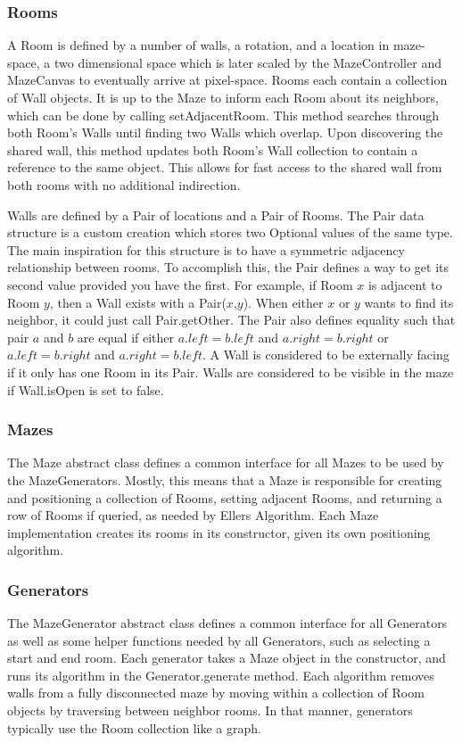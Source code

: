 \documentclass[12pt,letterpaper]{article}
\begin{document}
	
	\subsubsection{Rooms}
	
	A Room is defined by a number of walls, a rotation, and a location in maze-space, a two dimensional space which is later scaled by the MazeController and MazeCanvas to eventually arrive at pixel-space. Rooms each contain a collection of Wall objects. It is up to the Maze to inform each Room about its neighbors, which can be done by calling setAdjacentRoom. This method searches through both Room's Walls until finding two Walls which overlap. Upon discovering the shared wall, this method updates both Room's Wall collection to contain a reference to the same object. This allows for fast access to the shared wall from both rooms with no additional indirection.
	
	Walls are defined by a Pair of locations and a Pair of Rooms. The Pair data structure is a custom creation which stores two Optional values of the same type. The main inspiration for this structure is to have a symmetric adjacency relationship between rooms. To accomplish this, the Pair defines a way to get its second value provided you have the first. For example, if Room $x$ is adjacent to Room $y$, then a Wall exists with a Pair($x$,$y$). When either $x$ or $y$ wants to find its neighbor, it could just call Pair.getOther. The Pair also defines equality such that pair $a$ and $b$ are equal if either $a.left=b.left$ and $a.right=b.right$ or $a.left=b.right$ and $a.right=b.left$. A Wall is considered to be externally facing if it only has one Room in its Pair. Walls are considered to be visible in the maze if Wall.isOpen is set to false.
	
	\subsubsection{Mazes}
	
	The Maze abstract class defines a common interface for all Mazes to be used by the MazeGenerators. Mostly, this means that a Maze is responsible for creating and positioning a collection of Rooms, setting adjacent Rooms, and returning a row of Rooms if queried, as needed by Ellers Algorithm. Each Maze implementation creates its rooms in its constructor, given its own positioning algorithm.
	
	\subsubsection{Generators}
	
	The MazeGenerator abstract class defines a common interface for all Generators as well as some helper functions needed by all Generators, such as selecting a start and end room. Each generator takes a Maze object in the constructor, and runs its algorithm in the Generator.generate method. Each algorithm removes walls from a fully disconnected maze by moving within a collection of Room objects by traversing between neighbor rooms. In that manner, generators typically use the Room collection like a graph.
	
	
\end{document}
